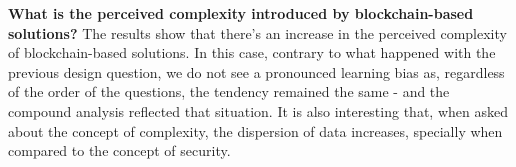 \textbf{What is the perceived complexity introduced by blockchain-based solutions?} The results show that there's an increase in the perceived complexity of blockchain-based solutions. In this case, contrary to what happened with the previous design question, we do not see a pronounced learning bias as, regardless of the order of the questions, the tendency remained the same - and the compound analysis reflected that situation. It is also interesting that, when asked about the concept of complexity, the dispersion of data increases, specially when compared to the concept of security.